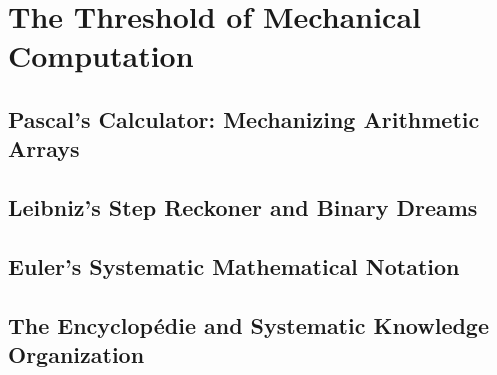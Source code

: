 
\chapter{The Threshold of Mechanical Computation}

\section{Pascal's Calculator: Mechanizing Arithmetic Arrays}

\section{Leibniz's Step Reckoner and Binary Dreams}

\section{Euler's Systematic Mathematical Notation}

\section{The Encyclopédie and Systematic Knowledge Organization}
